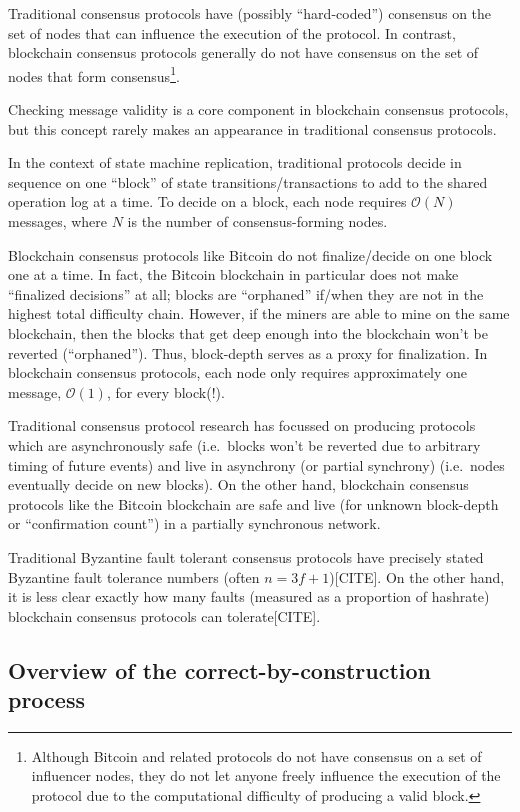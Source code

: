 \documentclass{article}
\theoremstyle{definition}
\begin{document}
Traditional consensus protocols have (possibly ``hard-coded'') consensus on the set of nodes that can influence the execution of the protocol. In contrast, blockchain consensus protocols generally do not have consensus on the set of nodes that form consensus\footnote{Although Bitcoin and related protocols do not have consensus on a set of influencer nodes, they do not let anyone freely influence the execution of the protocol due to the computational difficulty of producing a valid block.}.

Checking message validity is a core component in blockchain consensus protocols, but this concept rarely makes an appearance in traditional consensus protocols.

In the context of state machine replication, traditional protocols decide in sequence on one ``block'' of state transitions/transactions to add to the shared operation log at a time.  To decide on a block, each node requires $\mathcal{O}(N)$ messages, where $N$ is the number of consensus-forming nodes.

Blockchain consensus protocols like Bitcoin do not finalize/decide on one block one at a time. In fact, the Bitcoin blockchain in particular does not make ``finalized decisions'' at all; blocks are ``orphaned'' if/when they are not in the highest total difficulty chain. However, if the miners are able to mine on the same blockchain, then the blocks that get deep enough into the blockchain won't be reverted (``orphaned''). Thus, block-depth serves as a proxy for finalization. In blockchain consensus protocols, each node only requires approximately one message, $\mathcal{O}(1)$, for every block(!).

Traditional consensus protocol research has focussed on producing protocols which are asynchronously safe (i.e.\ blocks won't be reverted due to arbitrary timing of future events) and live in asynchrony (or partial synchrony) (i.e.\ nodes eventually decide on new blocks). On the other hand, blockchain consensus protocols like the Bitcoin blockchain are safe and live (for unknown block-depth or ``confirmation count'') in a partially synchronous network.

Traditional Byzantine fault tolerant consensus protocols have precisely stated Byzantine fault tolerance numbers (often $n = 3f + 1$)[CITE]. On the other hand, it is less clear exactly how many faults (measured as a proportion of hashrate) blockchain consensus protocols can tolerate[CITE].

\subsection{Overview of the correct-by-construction process}
\end{document}
